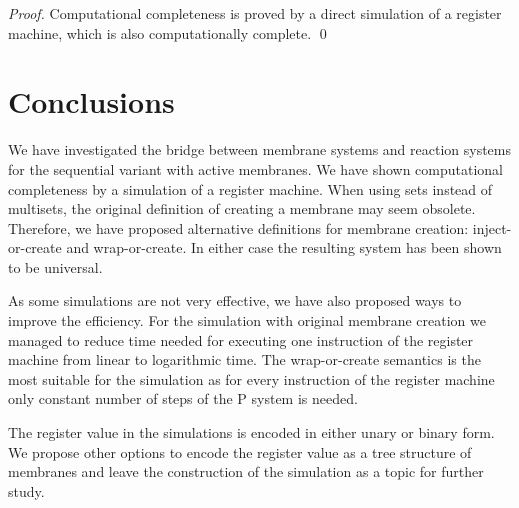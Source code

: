 \documentclass[llncs,submission,copyright,creativecommons]{../lib/lncs/llncs}
\begin{document}
\begin{proof}
  Computational completeness is proved by a direct simulation of a register machine, which is also computationally complete. \qed
\end{proof}



\section*{Conclusions} %
\label{sec:conclusions}

We have investigated the bridge between membrane systems and reaction systems for the sequential variant with active membranes. We have shown computational completeness by a simulation of a register machine. When using sets instead of multisets, the original definition of creating a membrane may seem obsolete. Therefore, we have proposed alternative definitions for membrane creation: inject-or-create and wrap-or-create. In either case the resulting system has been shown to be universal.

As some simulations are not very effective, we have also proposed ways to improve the efficiency. For the simulation with original membrane creation we managed to reduce time needed for executing one instruction of the register machine from linear to logarithmic time. The wrap-or-create semantics is the most suitable for the simulation as for every instruction of the register machine only constant number of steps of the P system is needed.

The register value in the simulations is encoded in either unary or binary form. We propose other options to encode the register value as a tree structure of membranes and leave the construction of the simulation as a topic for further study.



\end{document}
